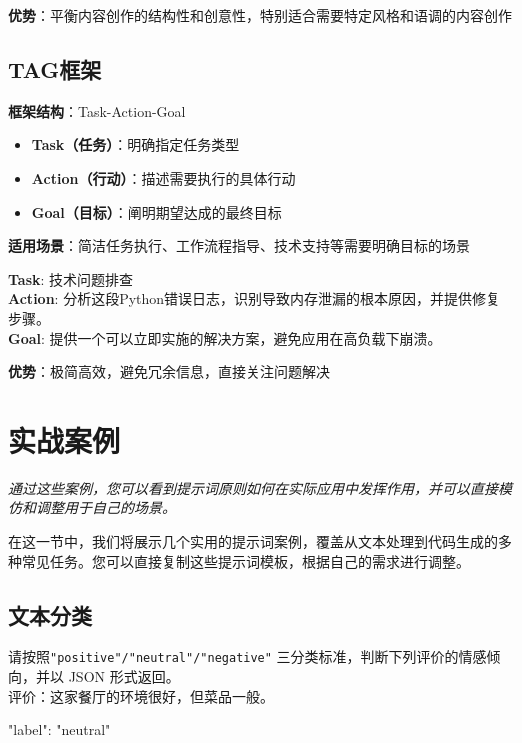 \documentclass[12pt]{ctexart}
\newcommand{\chapternote}[1]{\vspace{-0.3cm}\par\noindent\textit{\small #1}\vspace{0.3cm}}
\begin{document}
\textbf{优势}：平衡内容创作的结构性和创意性，特别适合需要特定风格和语调的内容创作

\subsection{TAG框架}

\textbf{框架结构}：Task-Action-Goal

\begin{itemize}
  \item \textbf{Task（任务）}：明确指定任务类型
  \item \textbf{Action（行动）}：描述需要执行的具体行动
  \item \textbf{Goal（目标）}：阐明期望达成的最终目标
\end{itemize}

\textbf{适用场景}：简洁任务执行、工作流程指导、技术支持等需要明确目标的场景

\begin{promptbox}
\textbf{Task}: 技术问题排查\\

\textbf{Action}: 分析这段Python错误日志，识别导致内存泄漏的根本原因，并提供修复步骤。\\

\textbf{Goal}: 提供一个可以立即实施的解决方案，避免应用在高负载下崩溃。
\end{promptbox}

\textbf{优势}：极简高效，避免冗余信息，直接关注问题解决

\section{实战案例}
\chapternote{通过这些案例，您可以看到提示词原则如何在实际应用中发挥作用，并可以直接模仿和调整用于自己的场景。}

在这一节中，我们将展示几个实用的提示词案例，覆盖从文本处理到代码生成的多种常见任务。您可以直接复制这些提示词模板，根据自己的需求进行调整。

\subsection{文本分类}
\begin{promptbox}
请按照\texttt{"positive"/"neutral"/"negative"} 三分类标准，判断下列评价的情感倾向，并以 JSON 形式返回。\\
评价：这家餐厅的环境很好，但菜品一般。
\end{promptbox}
\begin{outputbox}
{"label": "neutral"}
\end{outputbox}
\end{document}
